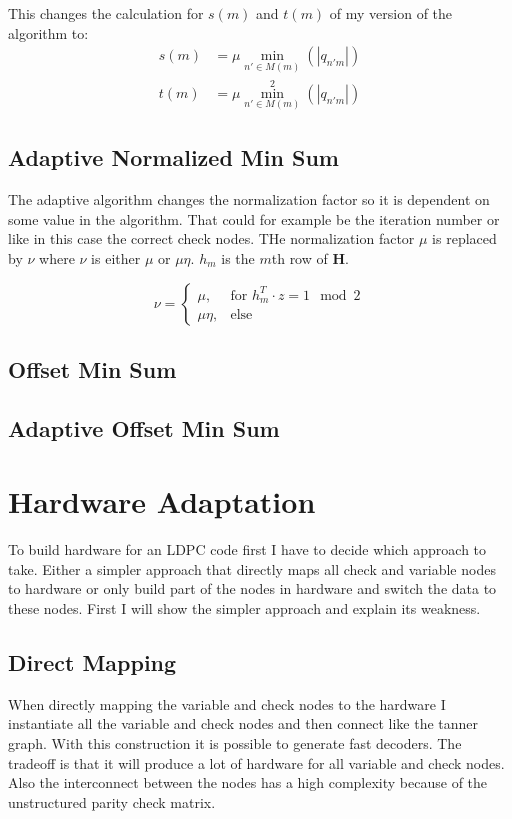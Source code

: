 This changes the calculation for $s(m)$ and $t(m)$ of my version of the algorithm to:
\begin{align}
    s(m) & = \mu \min_{n' \in M(m)}(\left|q_{n'm}\right|) \\
    t(m) & = \mu \min_{n' \in M(m)}^2(\left|q_{n'm}\right|) 
\end{align}

\subsection{Adaptive Normalized Min Sum}
The adaptive algorithm changes the normalization factor so it is dependent on some value in the algorithm. That could for example be the iteration number or like in this case the correct check nodes. THe normalization factor $\mu$ is replaced by $\nu$ where $\nu$ is either $\mu$ or $\mu \eta$. $h_m$ is the $m$th row of $\bm{H}$.


\begin{equation}
    \nu = \begin{cases}
        \mu, & \text{for } h^T_m \cdot z = 1 \mod 2 \\
        \mu \eta, & \text{else}
    \end{cases}
\end{equation}

\subsection{Offset Min Sum}

\subsection{Adaptive Offset Min Sum}

\section{Hardware Adaptation}
To build hardware for an LDPC code first I have to decide which approach to take. Either a simpler approach that directly maps all check and variable nodes to hardware or only build part of the nodes in hardware and switch the data to these nodes. First I will show the simpler approach and explain its weakness.

\subsection{Direct Mapping}
When directly mapping the variable and check nodes to the hardware I instantiate all the variable and check nodes and then connect like the tanner graph. With this construction it is possible to generate fast decoders. The tradeoff is that it will produce a lot of hardware for all variable and check nodes. Also the interconnect between the nodes has a high complexity because of the unstructured parity check matrix.

